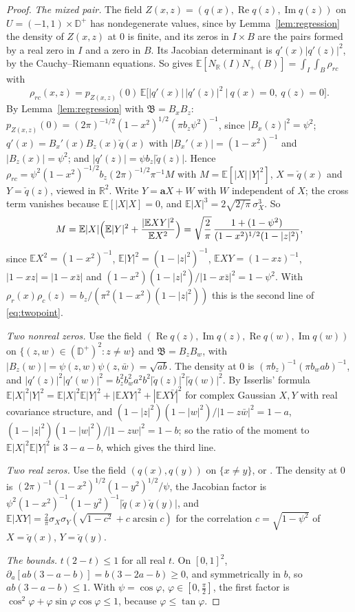 \documentclass[11pt]{amsart}
\theoremstyle{definition}
\theoremstyle{remark}
\numberwithin{equation}{section}
\newcommand{\R}{\mathbb{R}}
\newcommand{\D}{\mathbb{D}}
\newcommand{\E}{\mathbb{E}}
\DeclareMathOperator{\re}{Re}
\DeclareMathOperator{\im}{Im}
\begin{document}
\begin{proof}
\emph{The mixed pair.} The field $Z(x,z)=(q(x),\re q(z),\im q(z))$ on $U=(-1,1)\times\D^+$ has nondegenerate values, since by Lemma~\ref{lem:regression} the density of $Z(x,z)$ at $0$ is finite, and its zeros in $I\times B$ are the pairs formed by a real zero in $I$ and a zero in $B$. Its Jacobian determinant is $q'(x)|q'(z)|^2$, by the Cauchy--Riemann equations. So \cite[Theorem~6.2]{AW} gives $\E[N_\R(I)N_+(B)]=\int_I\int_B\rho_{rc}$ with
\[
\rho_{rc}(x,z)=p_{Z(x,z)}(0)\,\E\bigl[|q'(x)|\,|q'(z)|^2\ \big|\ q(x)=0,\ q(z)=0\bigr].
\]
By Lemma~\ref{lem:regression} with $\mathfrak B=B_xB_z$: $p_{Z(x,z)}(0)=(2\pi)^{-1/2}(1-x^2)^{1/2}(\pi b_z\psi^2)^{-1}$, since $|B_x(z)|^2=\psi^2$; $q'(x)=B_x'(x)B_z(x)\check q(x)$ with $|B_x'(x)|=(1-x^2)^{-1}$ and $|B_z(x)|=\psi^2$; and $|q'(z)|=\psi b_z|\check q(z)|$. Hence $\rho_{rc}=\psi^2(1-x^2)^{-1/2}b_z(2\pi)^{-1/2}\pi^{-1}M$ with $M=\E[|X|\,|Y|^2]$, $X=\check q(x)$ and $Y=\check q(z)$, viewed in $\R^2$. Write $Y=\mathbf aX+W$ with $W$ independent of $X$; the cross term vanishes because $\E[|X|X]=0$, and $\E|X|^3=2\sqrt{2/\pi}\,\sigma_X^3$. So
\[
M=\E|X|\Bigl(\E|Y|^2+\frac{|\E XY|^2}{\E X^2}\Bigr)=\sqrt{\frac2\pi}\,\frac{1+(1-\psi^2)}{(1-x^2)^{1/2}(1-|z|^2)},
\]
since $\E X^2=(1-x^2)^{-1}$, $\E|Y|^2=(1-|z|^2)^{-1}$, $\E XY=(1-xz)^{-1}$, $|1-xz|=|1-x\bar z|$ and $(1-x^2)(1-|z|^2)/|1-x\bar z|^2=1-\psi^2$. With $\rho_r(x)\rho_c(z)=b_z/(\pi^2(1-x^2)(1-|z|^2))$ this is the second line of \eqref{eq:twopoint}.

\emph{Two nonreal zeros.} Use the field $(\re q(z),\im q(z),\re q(w),\im q(w))$ on $\{(z,w)\in(\D^+)^2:z\ne w\}$ and $\mathfrak B=B_zB_w$, with $|B_z(w)|=\psi(z,w)\psi(z,\bar w)=\sqrt{ab}$. The density at $0$ is $(\pi b_z)^{-1}(\pi b_wab)^{-1}$, and $|q'(z)|^2|q'(w)|^2=b_z^2b_w^2a^2b^2|\check q(z)|^2|\check q(w)|^2$. By Isserlis' formula $\E|X|^2|Y|^2=\E|X|^2\E|Y|^2+|\E XY|^2+|\E X\bar Y|^2$ for complex Gaussian $X,Y$ with real covariance structure, and $(1-|z|^2)(1-|w|^2)/|1-z\bar w|^2=1-a$, $(1-|z|^2)(1-|w|^2)/|1-zw|^2=1-b$; so the ratio of the moment to $\E|X|^2\E|Y|^2$ is $3-a-b$, which gives the third line.

\emph{Two real zeros.} Use the field $(q(x),q(y))$ on $\{x\ne y\}$, or \cite[Lemma~6.1]{MS}. The density at $0$ is $(2\pi)^{-1}(1-x^2)^{1/2}(1-y^2)^{1/2}/\psi$, the Jacobian factor is $\psi^2(1-x^2)^{-1}(1-y^2)^{-1}|\check q(x)\check q(y)|$, and $\E|XY|=\frac2\pi\sigma_X\sigma_Y(\sqrt{1-c^2}+c\arcsin c)$ for the correlation $c=\sqrt{1-\psi^2}$ of $X=\check q(x)$, $Y=\check q(y)$.

\emph{The bounds.} $t(2-t)\le1$ for all real $t$. On $[0,1]^2$, $\partial_a[ab(3-a-b)]=b(3-2a-b)\ge0$, and symmetrically in $b$, so $ab(3-a-b)\le1$. With $\psi=\cos\varphi$, $\varphi\in[0,\frac\pi2]$, the first factor is $\cos^2\varphi+\varphi\sin\varphi\cos\varphi\le1$, because $\varphi\le\tan\varphi$.
\end{proof}
\end{document}

